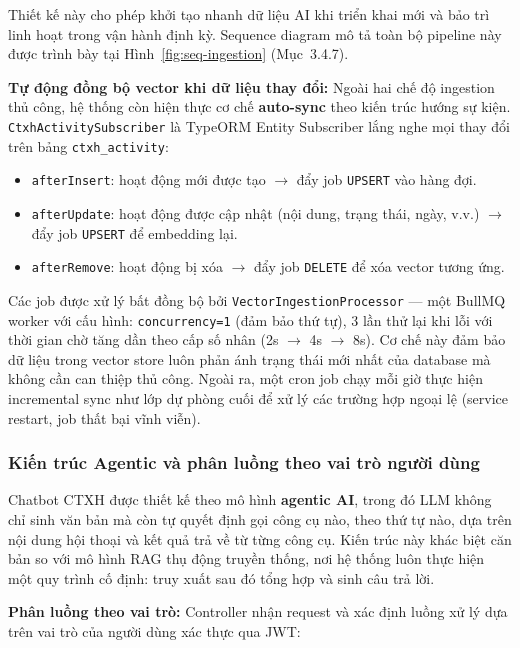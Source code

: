 Thiết kế này cho phép khởi tạo nhanh dữ liệu AI khi triển khai mới và bảo trì linh hoạt trong vận hành định kỳ. Sequence diagram mô tả toàn bộ pipeline này được trình bày tại Hình~\ref{fig:seq-ingestion} (Mục~3.4.7).

\textbf{Tự động đồng bộ vector khi dữ liệu thay đổi:} Ngoài hai chế độ ingestion thủ công, hệ thống còn hiện thực cơ chế \textbf{auto-sync} theo kiến trúc hướng sự kiện. \texttt{CtxhActivitySubscriber} là TypeORM Entity Subscriber lắng nghe mọi thay đổi trên bảng \texttt{ctxh\_activity}:
\begin{itemize}
	\item \texttt{afterInsert}: hoạt động mới được tạo $\rightarrow$ đẩy job \texttt{UPSERT} vào hàng đợi.
	\item \texttt{afterUpdate}: hoạt động được cập nhật (nội dung, trạng thái, ngày, v.v.) $\rightarrow$ đẩy job \texttt{UPSERT} để embedding lại.
	\item \texttt{afterRemove}: hoạt động bị xóa $\rightarrow$ đẩy job \texttt{DELETE} để xóa vector tương ứng.
\end{itemize}

Các job được xử lý bất đồng bộ bởi \texttt{VectorIngestionProcessor} — một BullMQ worker với cấu hình: \texttt{concurrency=1} (đảm bảo thứ tự), 3 lần thử lại khi lỗi với thời gian chờ tăng dần theo cấp số nhân (2s $\rightarrow$ 4s $\rightarrow$ 8s). Cơ chế này đảm bảo dữ liệu trong vector store luôn phản ánh trạng thái mới nhất của database mà không cần can thiệp thủ công. Ngoài ra, một cron job chạy mỗi giờ thực hiện incremental sync như lớp dự phòng cuối để xử lý các trường hợp ngoại lệ (service restart, job thất bại vĩnh viễn).

\subsubsection{Kiến trúc Agentic và phân luồng theo vai trò người dùng}
Chatbot CTXH được thiết kế theo mô hình \textbf{agentic AI}, trong đó LLM không chỉ sinh văn bản mà còn tự quyết định gọi công cụ nào, theo thứ tự nào, dựa trên nội dung hội thoại và kết quả trả về từ từng công cụ. Kiến trúc này khác biệt căn bản so với mô hình RAG thụ động truyền thống, nơi hệ thống luôn thực hiện một quy trình cố định: truy xuất sau đó tổng hợp và sinh câu trả lời.

\textbf{Phân luồng theo vai trò:} Controller nhận request và xác định luồng xử lý dựa trên vai trò của người dùng xác thực qua JWT:

